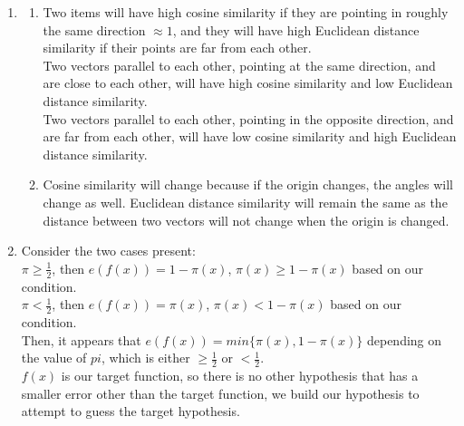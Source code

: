 \documentclass{article}
\begin{document}
    \begin{enumerate}
        \item \begin{enumerate}[label=(\alph*)]
            \item Two items will have high cosine similarity if they are pointing in roughly the same direction $\approx 1$, and they will have high Euclidean distance similarity if their points are far from each other.\\[0.25in]
            Two vectors parallel to each other, pointing at the same direction, and are close to each other, will have high cosine similarity and low Euclidean distance similarity.\\[0.25in]
            Two vectors parallel to each other, pointing in the opposite direction, and are far from each other, will have low cosine similarity and high Euclidean distance similarity.
            \item Cosine similarity will change because if the origin changes, the angles will change as well. Euclidean distance similarity will remain the same as the distance between two vectors will not change when the origin is changed.
        \end{enumerate}

        \item Consider the two cases present:\\
        $\pi \geq \frac{1}{2}$, then $e(f(x)) = 1 - \pi(x)$, $\pi(x) \geq 1 - \pi(x)$ based on our condition.\\
        $\pi < \frac{1}{2}$, then $e(f(x)) = \pi(x)$, $\pi(x) < 1 - \pi(x)$ based on our condition.\\
        Then, it appears that $e(f(x)) = min\{\pi(x), 1 - \pi(x)\}$ depending on the value of $pi$, which is either $\geq \frac{1}{2}$ or $< \frac{1}{2}$.\\[0.25in]
        $f(x)$ is our target function, so there is no other hypothesis that has a smaller error other than the target function, we build our hypothesis to attempt to guess the target hypothesis.


\end{enumerate}
\end{document}
